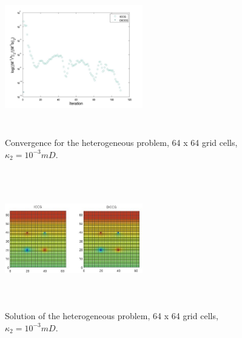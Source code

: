 \documentclass{ecmorXV}
\begin{document}
\begin{figure}[!h]
\centering
\begin{minipage}{.4\textwidth}
 \centering
\includegraphics[width=6cm,height=6cm,keepaspectratio]
{conv_he_1.jpg}
\caption{Convergence for the heterogeneous problem, 64 x 64 grid cells,  $\kappa_2=10^{-3}mD$.}
\label{fig:convhe1}
\end{minipage}%
\hspace{1pt}
\begin{minipage}{.4\textwidth}
 \centering
\includegraphics[width=6cm,height=6cm,keepaspectratio]
{sol_he_1.jpg}
\caption{Solution of the heterogeneous problem, 64 x 64 grid cells,$\kappa_2=10^{-3}mD$.}
\label{fig:solhe1}
\end{minipage}
\end{figure}
\end{document}

